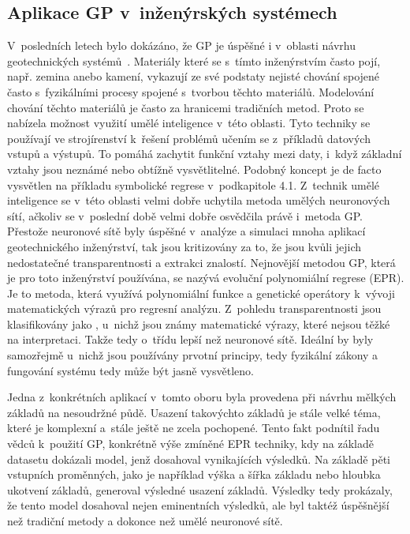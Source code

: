 \subsection*{Aplikace GP v~inženýrských systémech}
V~posledních letech bylo dokázáno, že GP je úspěšné i v~oblasti návrhu geotechnických systémů~\cite{ApplicationOfGP}. Materiály které se s~tímto inženýrstvím často pojí, např. zemina anebo kamení, vykazují ze své podstaty nejisté chování spojené často s~fyzikálními procesy spojené s~tvorbou těchto materiálů. Modelování chování těchto materiálů je často za hranicemi tradičních metod. Proto se nabízela možnost využití umělé inteligence v~této oblasti. Tyto techniky se používají ve strojírenství k~řešení problémů učením se z~příkladů datových vstupů a výstupů. To pomáhá zachytit funkční vztahy mezi daty, i~když základní vztahy jsou neznámé nebo obtížně vysvětlitelné. Podobný koncept je de facto vysvětlen na příkladu symbolické regrese v~podkapitole 4.1. Z~technik umělé inteligence se v~této oblasti velmi dobře uchytila metoda umělých neuronových sítí, ačkoliv se v~poslední době velmi dobře osvědčila právě i~metoda GP. Přestože neuronové sítě byly úspěšné v~analýze a simulaci mnoha aplikací geotechnického inženýrství, tak jsou kritizovány za to, že jsou  kvůli jejich nedostatečné transparentnosti a extrakci znalostí. Nejnovější metodou GP, která je pro toto inženýrství používána, se nazývá evoluční polynomiální regrese (EPR). Je to metoda, která využívá polynomiální funkce a genetické operátory k~vývoji matematických výrazů pro regresní analýzu. Z~pohledu transparentnosti jsou klasifikovány jako , u~nichž jsou známy matematické výrazy, které nejsou těžké na interpretaci. Takže tedy o~třídu lepší než neuronové sítě. Ideální by byly samozřejmě  u~nichž jsou používány prvotní principy, tedy fyzikální zákony a fungování systému tedy může být jasně vysvětleno.

Jedna z~konkrétních aplikací v~tomto oboru byla provedena při návrhu mělkých základů na nesoudržné půdě. Usazení takovýchto základů je stále velké téma, které je komplexní a~stále ještě ne zcela pochopené. Tento fakt podnítil řadu vědců k~použití GP, konkrétně výše zmíněné EPR techniky, kdy na základě datasetu dokázali model, jenž dosahoval vynikajících výsledků. Na základě pěti vstupních proměnných, jako je například výška a šířka základu nebo hloubka ukotvení základů, generoval výsledné usazení základů. Výsledky tedy prokázaly, že tento model dosahoval nejen eminentních výsledků, ale byl taktéž úspěšnější než tradiční metody a dokonce než umělé neuronové sítě. \\

